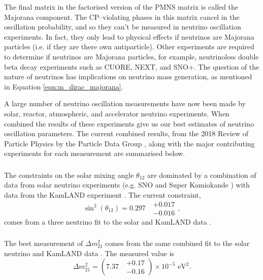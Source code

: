 {The final matrix in the factorised version of the PMNS matrix is called the 
Majorana component. The CP--violating phases in this matrix cancel in the 
oscillation probability, and so they can't be measured in neutrino oscillation 
experiments.  In fact, they only lead to physical effects if neutrinos are 
Majorana particles (i.e. if they are there own antiparticle). Other experiments 
are required to determine if neutrinos are Majorana particles, for example, 
neutrinoless double beta decay experiments such as CUORE\cite{Arnaboldi2004}, 
NEXT\cite{Alvarez2012}, and SNO+\cite{Andringa2016}. The question of the 
nature of neutrinos has implications on neutrino mass generation, as mentioned 
in Equation \ref{eqn:m_dirac_majorana}.

A large number of neutrino oscillation measurements have now been made by
solar, reactor, atmospheric, and accelerator neutrino experiments. When combined
the results of these experiments give us our best estimates of neutrino 
oscillation parameters. The current combined results, from the 2018 
Review of Particle Physics by the Particle Data Group \cite{PhysRevD.98.030001},
along with the major contributing experiments for each measurement are 
summarised below.

\subsubsection*{}

The constraints on the solar mixing angle $\theta_{12}$ are dominated by a
combination of data from solar neutrino experiments (e.g. SNO \cite{Ahmad2002}
and Super Kamiokande \cite{PhysRevLett.86.5651}) with data from the KamLAND 
experiment \cite{Araki2005}. The current constraint,
\begin{equation}
	\label{eqn:theta_12}
	\sin^2(\theta_{12}) = 0.297 \mbox{ } \substack{+ 0.017 \\ - 0.016},
\end{equation}
comes from a three neutrino fit to the solar and KamLAND data 
\cite{Capozzi:2016rtj}.

\subsubsection*{}

The best measurement of $\Delta m^2_{21}$ comes from the same combined fit to 
the solar neutrino and KamLAND data \cite{Capozzi:2016rtj}. The measured value
is
\begin{equation}
	\label{eqn:delta_m_21}
	\Delta m^2_{21} = (7.37 \mbox{ } \substack{+ 0.17 \\ - 0.16}) \times 10^{-5} \mbox{  eV}^2.
\end{equation}

}
